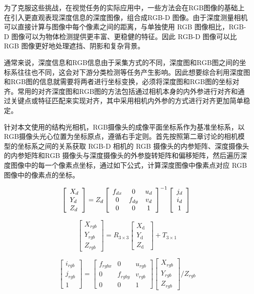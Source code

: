 为了克服这些挑战，在视觉任务的实际应用中，一些方法会在RGB图像的基础上在引入更直观表现深度信息的深度图像，组合成RGB-D 图像。由于深度测量相机可以直接计算与图像中每个像素之间的距离，与单独使用 RGB 图像相比，RGB-D 图像可以为物体检测提供更丰富、更稳健的特征。因此 RGB-D 图像可以比 RGB 图像更好地处理遮挡、阴影和复杂背景。

通常来说，深度信息和RGB信息由于采集方式的不同，深度图和RGB图之间的坐标系往往也不同，这会对下游分类检测等任务产生影响。因此想要综合利用深度图和RGB图的信息就需要将两者进行坐标变换，必须将深度图和RGB图的坐标对齐。常用的对齐深度图和RGB图的方法包括通过相机本身的内外参进行对齐和通过关键点或特征匹配来实现对齐，其中采用相机内外参的方式进行对齐更加简单稳定。

针对本文使用的结构光相机，RGB摄像头的成像平面坐标系作为基准坐标系，以RGB摄像头光心位置为坐标原点，遵循右手定则。首先按照第二章讨论的相机模型的坐标系之间的关系获取 RGB-D 相机的 RGB 摄像头的内参矩阵、深度摄像头的内参矩阵和RGB 摄像头与深度摄像头的外参旋转矩阵和偏移矩阵，然后遍历深度图像中的每一个像素点坐标，通过如下公式，计算深度图像中像素点对应 RGB 图像中的像素点的坐标。

$$
\left[\begin{array}{l}
X_{d}  \\
Y_{d} \\
Z_{d}
\end{array}\right]=Z_{d}\left[\begin{array}{ccc}
f_{dx} & 0 & u_{d} \\
0 & f_{dy} & v_{d}\\
0 & 0 & 1
\end{array}\right]^{-1}\left[\begin{array}{c}
j_{d} \\
i_{d} \\
1
\end{array}\right]\\
$$

$$
\left[\begin{array}{l}X_{r g b} \\Y_{r g b} \\Z_{r g b}\end{array}\right]=R_{3 \times 3}\left[\begin{array}{l}X_{\text {d }} \\Y_{\text {d}} \\Z_{\text {d}}\end{array}\right]+T_{3 \times 1}
$$

$$
\left[\begin{array}{l}i_{rgb}  \\j_{rgb} \\1\end{array}\right]=\left[\begin{array}{ccc}f_{rgbx} & 0 & u_{rgb} \\0 & f_{rgby} & v_{rgb}\\0 & 0 & 1\end{array}\right]\left[\begin{array}{c}X_{rgb} \\Y_{rgb} \\Z_{rgb}\end{array}\right]/Z_{rgb}
$$

